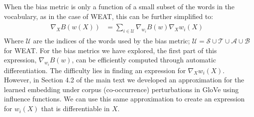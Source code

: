\documentclass{article}
\begin{document}
When the bias metric is only a function of a small subset of the words in the vocabulary, as in the case of WEAT, this can be further simplified to:
\begin{align}
\begin{split}
\label{eq:bias_grad_ext}
\nabla_{X} B(w(X)) &=  \sum_{i \in \mathcal{U}} \nabla_{w_i} B(w) \nabla_{X} w_i(X)
\end{split}
\end{align}
Where $\mathcal{U}$ are the indices of the words used by the bias metric;  $\mathcal{U} = \mathcal{S} \cup \mathcal{T} \cup \mathcal{A} \cup \mathcal{B}$ for WEAT.
For the bias metrics we have explored, the first part of this expression, $\nabla_{w_i} B(w)$, can be efficiently computed through automatic differentiation. The difficulty lies in finding an expression for $\nabla_{X} w_i(X)$. However, in Section 4.2 of the main text we developed an approximation for the learned embedding under corpus (co-occurrence) perturbations in GloVe using influence functions. We can use this same approximation to create an expression for $w_i(X)$ that is differentiable in $X$.
\end{document}
